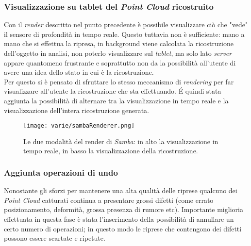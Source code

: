 \subsubsection{Visualizzazione su tablet del \emph{Point Cloud} ricostruito}
Con il \emph{render} descritto nel punto precedente è possibile visualizzare ciò che "vede" il sensore di profondità in tempo reale. Questo tuttavia non è sufficiente: mano a mano che si effettua la ripresa, in background viene calcolata la ricostruzione dell'oggetto in analisi, non poterlo visualizzare sul \emph{tablet}, ma solo lato \emph{server} appare quantomeno frustrante e soprattutto non da la possibilità all'utente di avere una idea dello stato in cui è la ricostruzione. \\
Per questo si è pensato di sfruttare lo stesso meccanismo di \emph{rendering} per far visualizzare all'utente la ricostruzione che sta effettuando. É quindi stata aggiunta la possibilità di alternare tra la visualizzazione in tempo reale e la visualizzazione dell'intera ricostruzione generata.\\
\begin{figure}[!h] 
    \centering 
    \texttt{[image: varie/sambaRenderer.png]} 
    \caption{Le due modalità del render di \emph{Samba}: in alto la visualizzazione in tempo reale, in basso la visualizzazione della ricostruzione.}
\end{figure}


\subsubsection{Aggiunta operazioni di undo}
Nonostante gli sforzi per mantenere una alta qualità delle riprese qualcuno dei \emph{Point Cloud} catturati continua a presentare grossi difetti (come errato posizionamento, deformità, grossa presenza di rumore etc).
Importante miglioria effettuata in questa fase è stata l'inserimento della possibilità di annullare un certo numero di operazioni; in questo modo le riprese che contengono dei difetti possono essere scartate e ripetute.

